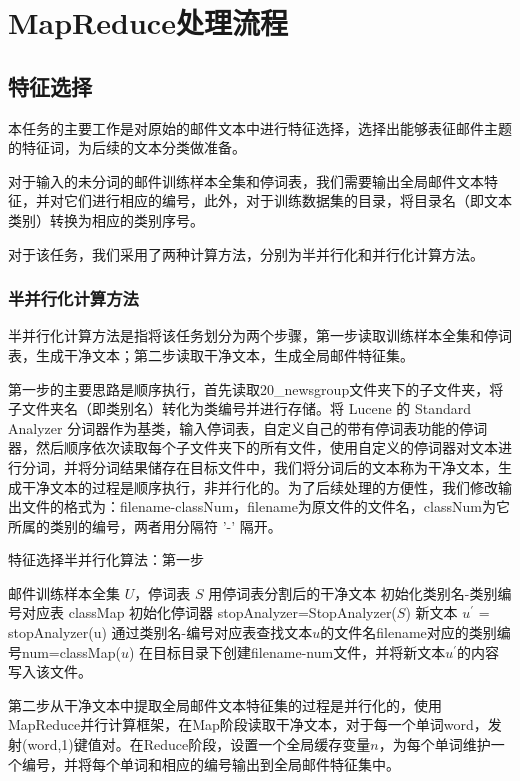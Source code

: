 \documentclass[lang=cn,11pt]{elegantpaper}
\begin{document}
\section{MapReduce处理流程}
\subsection{特征选择}
本任务的主要工作是对原始的邮件文本中进行特征选择，选择出能够表征邮件主题的特征词，为后续的文本分类做准备。\par
对于输入的未分词的邮件训练样本全集和停词表，我们需要输出全局邮件文本特征，并对它们进行相应的编号，此外，对于训练数据集的目录，将目录名（即文本类别）转换为相应的类别序号。\par
对于该任务，我们采用了两种计算方法，分别为半并行化和并行化计算方法。
\subsubsection{半并行化计算方法}
半并行化计算方法是指将该任务划分为两个步骤，第一步读取训练样本全集和停词表，生成干净文本；第二步读取干净文本，生成全局邮件特征集。\par
第一步的主要思路是顺序执行，首先读取20\_newsgroup文件夹下的子文件夹，将子文件夹名（即类别名）转化为类编号并进行存储。将 Lucene 的 Standard Analyzer 分词器作为基类，输入停词表，自定义自己的带有停词表功能的停词器，然后顺序依次读取每个子文件夹下的所有文件，使用自定义的停词器对文本进行分词，并将分词结果储存在目标文件中，我们将分词后的文本称为干净文本，生成干净文本的过程是顺序执行，非并行化的。为了后续处理的方便性，我们修改输出文件的格式为：filename-classNum，filename为原文件的文件名，classNum为它所属的类别的编号，两者用分隔符 '-' 隔开。\par
\begin{algorithm}[!htb]
  \caption{特征选择半并行化算法：第一步}
  \label{alg:Framwork}
  \begin{algorithmic}[1]
    \Require
    邮件训练样本全集 $U$，停词表 $S$
    \Ensure
    用停词表分割后的干净文本
    \State 初始化类别名-类别编号对应表 classMap
    \State 初始化停词器 stopAnalyzer=StopAnalyzer($S$)
      \State 新文本 $u^\prime$ = stopAnalyzer(u)
      \State 通过类别名-编号对应表查找文本$u$的文件名filename对应的类别编号num=classMap($u$)
      \State 在目标目录下创建filename-num文件，并将新文本$u^\prime$的内容写入该文件。
   \EndFor
  \end{algorithmic}
\end{algorithm}
第二步从干净文本中提取全局邮件文本特征集的过程是并行化的，使用MapReduce并行计算框架，在Map阶段读取干净文本，对于每一个单词word，发射(word,1)键值对。在Reduce阶段，设置一个全局缓存变量$n$，为每个单词维护一个编号，并将每个单词和相应的编号输出到全局邮件特征集中。\par
\end{document}
